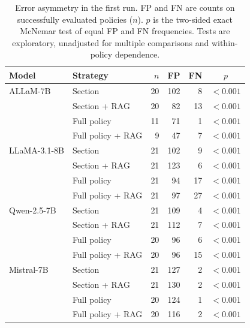 \begin{table}[!t]
\centering\footnotesize
\setlength{\tabcolsep}{3pt}
\caption{Error asymmetry in the first run. FP and FN are counts on successfully evaluated policies ($n$). $p$ is the two-sided exact McNemar test of equal FP and FN frequencies. Tests are exploratory, unadjusted for multiple comparisons and within-policy dependence.}
\label{tab:error_asymmetry}
\begin{tabular}{llrrrc}
\toprule
Model & Strategy & $n$ & FP & FN & $p$ \\
\midrule
ALLaM-7B & Section & 20 & 102 & 8 & $<0.001$ \\
 & Section + RAG & 20 & 82 & 13 & $<0.001$ \\
 & Full policy & 11 & 71 & 1 & $<0.001$ \\
 & Full policy + RAG & 9 & 47 & 7 & $<0.001$ \\
\midrule
LLaMA-3.1-8B & Section & 21 & 102 & 9 & $<0.001$ \\
 & Section + RAG & 21 & 123 & 6 & $<0.001$ \\
 & Full policy & 21 & 94 & 17 & $<0.001$ \\
 & Full policy + RAG & 21 & 97 & 27 & $<0.001$ \\
\midrule
Qwen-2.5-7B & Section & 21 & 109 & 4 & $<0.001$ \\
 & Section + RAG & 21 & 112 & 7 & $<0.001$ \\
 & Full policy & 20 & 96 & 6 & $<0.001$ \\
 & Full policy + RAG & 20 & 96 & 15 & $<0.001$ \\
\midrule
Mistral-7B & Section & 21 & 127 & 2 & $<0.001$ \\
 & Section + RAG & 21 & 130 & 2 & $<0.001$ \\
 & Full policy & 20 & 124 & 1 & $<0.001$ \\
 & Full policy + RAG & 20 & 116 & 2 & $<0.001$ \\
\bottomrule
\end{tabular}
\end{table}